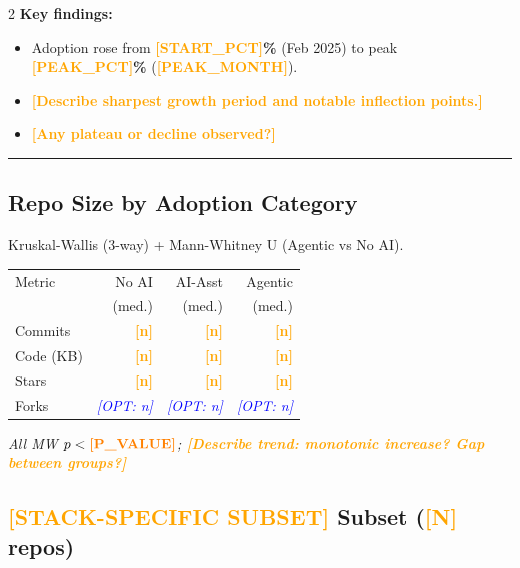 \documentclass[10pt,a4paper]{article}
\newcommand{\FILLIN}[1]{\textcolor{orange}{\textbf{[#1]}}}
\newcommand{\OPT}[1]{\textcolor{blue}{\textit{[OPT: #1]}}}
\begin{document}
\begin{multicols}{2}
\vspace{3pt}
\textbf{Key findings:}
\begin{itemize}\setlength\itemsep{0pt}
  \item Adoption rose from \textbf{\FILLIN{START\_PCT}\%} (Feb 2025)
        to peak \textbf{\FILLIN{PEAK\_PCT}\%} (\FILLIN{PEAK\_MONTH}).
  \item \FILLIN{Describe sharpest growth period and notable inflection points.}
  \item \FILLIN{Any plateau or decline observed?}
\end{itemize}

\vspace{3pt}
\hrule
\vspace{3pt}

\subsection*{Repo Size by Adoption Category}
Kruskal-Wallis (3-way) + Mann-Whitney U (Agentic vs No AI).

\vspace{2pt}
\begin{tabular}{@{}lrrr@{}}
\toprule
Metric & No AI & AI-Asst & Agentic \\
       & (med.)& (med.)  & (med.)  \\
\midrule
Commits     & \FILLIN{n} & \FILLIN{n} & \FILLIN{n} \\
Code (KB)   & \FILLIN{n} & \FILLIN{n} & \FILLIN{n} \\
\midrule
Stars       & \FILLIN{n} & \FILLIN{n} & \FILLIN{n} \\
Forks       & \OPT{n}    & \OPT{n}    & \OPT{n}    \\
\bottomrule
\end{tabular}

\vspace{2pt}
\textit{All MW $p < \FILLIN{P\_VALUE}$;\;
\FILLIN{Describe trend: monotonic increase? Gap between groups?}}

\columnbreak

\subsection*{\FILLIN{STACK-SPECIFIC SUBSET} Subset (\FILLIN{N} repos)}


\end{multicols}
\end{document}
